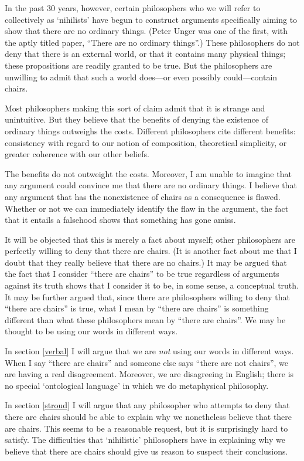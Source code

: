 \documentclass[11pt]{article}
\begin{document}
\begin{spacing}{1.5}
In the past 30 years, however, certain philosophers who we will refer
to collectively as `nihilists' have begun to construct arguments
specifically aiming to show that there are no ordinary things.  (Peter
Unger was one of the first, with the aptly titled paper, ``There are
no ordinary things''.)  These philosophers do not deny that there is
an external world, or that it contains many physical things; these
propositions are readily granted to be true.  But the philosophers are
unwilling to admit that such a world does---or even possibly
could---contain chairs.

Most philosophers making this sort of claim admit that it is strange
and unintuitive.  But they believe that the benefits of denying the
existence of ordinary things outweighs the costs.  Different
philosophers cite different benefits: consistency with regard to our
notion of composition, theoretical simplicity, or greater coherence
with our other beliefs.

The benefits do not outweight the costs.  Moreover, I am unable to
imagine that any argument could convince me that there are no ordinary
things.  I believe that any argument that has the nonexistence of
chairs as a consequence is flawed.  Whether or not we can immediately
identify the flaw in the argument, the fact that it entails a
falsehood shows that something has gone amiss.

It will be objected that this is merely a fact about myself; other
philosophers are perfectly willing to deny that there are chairs.  (It
is another fact about me that I doubt that they really believe that
there are no chairs.)  It may be argued that the fact that I consider
``there are chairs'' to be true regardless of arguments against its
truth shows that I consider it to be, in some sense, a conceptual
truth.  It may be further argued that, since there are philosophers
willing to deny that ``there are chairs'' is true, what I mean by
``there are chairs'' is something different than what these
philosophers mean by ``there are chairs''.  We may be thought to be
using our words in different ways.

In section \ref{verbal} I will argue that we are {\em not} using our
words in different ways.  When I say ``there are chairs'' and someone
else says ``there are not chairs'', we are having a real disagreement.
Moreover, we are disagreeing in English; there is no special
`ontological language' in which we do metaphysical philosophy.

In section \ref{stroud} I will argue that any philosopher who attempts
to deny that there are chairs should be able to explain why we
nonetheless believe that there are chairs.  This seems to be a
reasonable request, but it is surprisingly hard to satisfy.  The
difficulties that `nihilistic' philosophers have in explaining why we
believe that there are chairs should give us reason to suspect their
conclusions.


\end{spacing}
\end{document}
